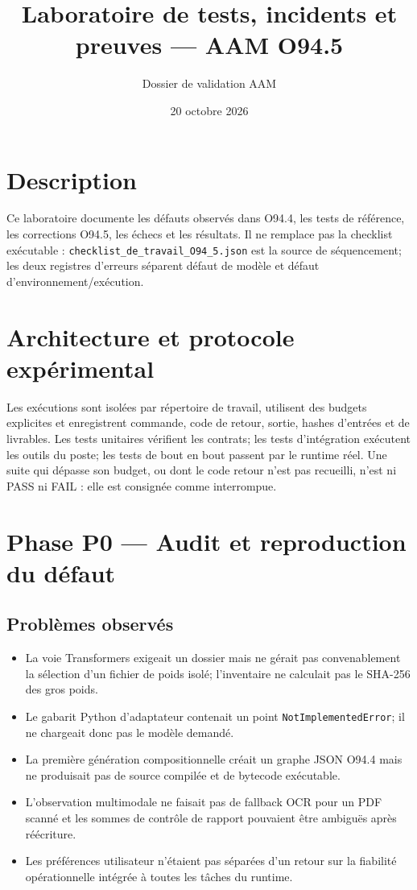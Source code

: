 \documentclass[11pt,a4paper]{article}
\title{Laboratoire de tests, incidents et preuves — AAM O94.5}
\author{Dossier de validation AAM}
\date{20 octobre 2026}
\begin{document}
\maketitle
\tableofcontents
\section{Description}
Ce laboratoire documente les défauts observés dans O94.4, les tests de référence, les corrections O94.5, les échecs et les résultats. Il ne remplace pas la checklist exécutable : \texttt{checklist\_de\_travail\_O94\_5.json} est la source de séquencement; les deux registres d'erreurs séparent défaut de modèle et défaut d'environnement/exécution.

\section{Architecture et protocole expérimental}
Les exécutions sont isolées par répertoire de travail, utilisent des budgets explicites et enregistrent commande, code de retour, sortie, hashes d'entrées et de livrables. Les tests unitaires vérifient les contrats; les tests d'intégration exécutent les outils du poste; les tests de bout en bout passent par le runtime réel. Une suite qui dépasse son budget, ou dont le code retour n'est pas recueilli, n'est ni PASS ni FAIL : elle est consignée comme interrompue.

\section{Phase P0 — Audit et reproduction du défaut}
\subsection{Problèmes observés}
\begin{itemize}
\item La voie Transformers exigeait un dossier mais ne gérait pas convenablement la sélection d'un fichier de poids isolé; l'inventaire ne calculait pas le SHA-256 des gros poids.
\item Le gabarit Python d'adaptateur contenait un point \texttt{NotImplementedError}; il ne chargeait donc pas le modèle demandé.
\item La première génération compositionnelle créait un graphe JSON O94.4 mais ne produisait pas de source compilée et de bytecode exécutable.
\item L'observation multimodale ne faisait pas de fallback OCR pour un PDF scanné et les sommes de contrôle de rapport pouvaient être ambiguës après réécriture.
\item Les préférences utilisateur n'étaient pas séparées d'un retour sur la fiabilité opérationnelle intégrée à toutes les tâches du runtime.
\end{itemize}
\end{document}
